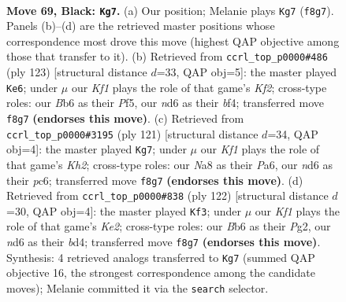 \documentclass[11pt]{article}
\begin{document}
\clearpage

\begin{figure}[p]\centering
\begin{subfigure}{0.46\textwidth}\centering
\resizebox{\linewidth}{!}{%
\newchessgame
\chessboard[
  setfen={n4k2/8/1b1N4/p3n3/P2pP3/1P5p/2B1P3/2K5 b - - 5 69},
  showmover=false,
  pgfstyle=straightmove, color=movearrow, markmove={f8-g7}
]}
\caption{}
\end{subfigure}\hfill
\begin{subfigure}{0.46\textwidth}\centering
\resizebox{\linewidth}{!}{%
\newchessgame
\chessboard[
  setfen={8/3n1k2/6p1/2p2pP1/2P2B1P/2b2N2/6K1/8 b - - 0 62},
  showmover=false,
  pgfstyle=straightmove, color=movearrow, markmove={f7-e6}
]}
\caption{}
\end{subfigure}
\\[4pt]
\begin{subfigure}{0.46\textwidth}\centering
\resizebox{\linewidth}{!}{%
\newchessgame
\chessboard[
  setfen={8/7k/p1P3p1/3p1b1p/3P1P1P/6B1/6P1/6K1 b - - 0 61},
  showmover=false,
  pgfstyle=straightmove, color=movearrow, markmove={h7-g7}
]}
\caption{}
\end{subfigure}\hfill
\begin{subfigure}{0.46\textwidth}\centering
\resizebox{\linewidth}{!}{%
\newchessgame
\chessboard[
  setfen={4n3/4k3/p2p4/B1pP3p/3bB3/1P5P/4K1P1/8 w - - 3 62},
  showmover=false,
  pgfstyle=straightmove, color=movearrow, markmove={e2-f3}
]}
\caption{}
\end{subfigure}
\caption{\textbf{Move 69, Black: \texttt{Kg7}.} (a) Our position; Melanie plays \texttt{Kg7} (\texttt{f8g7}). Panels (b)--(d) are the retrieved master positions whose correspondence most drove this move (highest QAP objective among those that transfer to it). (b) Retrieved from \texttt{ccrl\_top\_p0000\#486} (ply 123) [structural distance $d$=33, QAP obj=5]: the master played \texttt{Ke6}; under $\mu$ our \emph{Kf1} plays the role of that game's \emph{Kf2}; cross-type roles: our \emph{B}b6 as their \emph{P}f5, our \emph{n}d6 as their \emph{b}f4; transferred move \texttt{f8g7} \textbf{(endorses this move)}. (c) Retrieved from \texttt{ccrl\_top\_p0000\#3195} (ply 121) [structural distance $d$=34, QAP obj=4]: the master played \texttt{Kg7}; under $\mu$ our \emph{Kf1} plays the role of that game's \emph{Kh2}; cross-type roles: our \emph{N}a8 as their \emph{P}a6, our \emph{n}d6 as their \emph{p}c6; transferred move \texttt{f8g7} \textbf{(endorses this move)}. (d) Retrieved from \texttt{ccrl\_top\_p0000\#838} (ply 122) [structural distance $d$=30, QAP obj=4]: the master played \texttt{Kf3}; under $\mu$ our \emph{Kf1} plays the role of that game's \emph{Ke2}; cross-type roles: our \emph{B}b6 as their \emph{P}g2, our \emph{n}d6 as their \emph{b}d4; transferred move \texttt{f8g7} \textbf{(endorses this move)}. Synthesis: 4 retrieved analogs transferred to \texttt{Kg7} (summed QAP objective 16, the strongest correspondence among the candidate moves); Melanie committed it via the \texttt{search} selector.}
\label{fig:thought-m137}
\end{figure}
\end{document}
